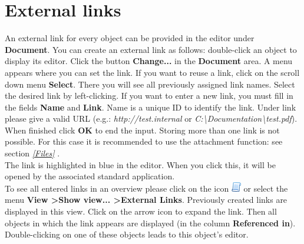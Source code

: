 \documentclass[a4paper,10pt]{book}
\begin{document}
\section{External links}
An external link for every object can be provided in the editor under \textbf{Document}. You can create an external link as follows: double-click an object
to display its editor. Click the button \textbf{Change...} in the \textbf{Document} area. A menu appears where you can set the link. If you want to reuse a
link, click on the scroll down menu \textbf{Select}. There you will see all previously assigned link names. Select the desired link by left-clicking.
If you want to enter a new link, you must fill in the fields \textbf{Name} and \textbf{Link}. Name is a unique ID to identify the link. Under link please
give a valid URL (e.g.: {\em http://test.internal} or {\em C:\textbackslash Documentation\textbackslash test.pdf}). When finished click \textbf{OK} to end the input.
Storing more than one link is not possible. For this case it is recommended to use the attachment function: see section {\em \ref{Files} }.
\newline\\
The link is highlighted in blue in the editor. When you click this, it will be opened by the associated standard application.
\newline\\
To see all entered links in an overview please click on the icon \includegraphics[height=2ex]{Icon/Richtlinien.png} or select the menu
\textbf{View \textgreater Show view... \textgreater External Links}. Previously created links are displayed in this view. Click on the arrow icon
to expand the link. Then all objects in which the link appears are displayed (in the column \textbf{Referenced in}). Double-clicking on one of these objects
leads to this object’s editor.
\end{document}
